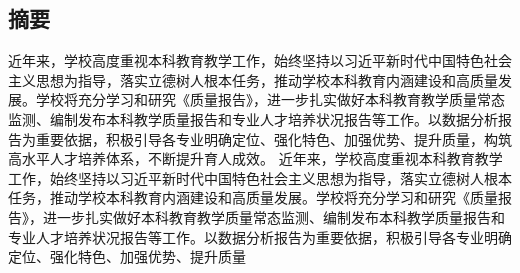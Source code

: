 \begin{ujnabstract}
\section[摘要]{摘\qquad 要}
%
%
%
近年来，学校高度重视本科教育教学工作，始终坚持以习近平新时代中国特色社会主义思想为指导，落实立德树人根本任务，推动学校本科教育内涵建设和高质量发展。学校将充分学习和研究《质量报告》，进一步扎实做好本科教育教学质量常态监测、编制发布本科教学质量报告和专业人才培养状况报告等工作。以数据分析报告为重要依据，积极引导各专业明确定位、强化特色、加强优势、提升质量，构筑高水平人才培养体系，不断提升育人成效。
近年来，学校高度重视本科教育教学工作，始终坚持以习近平新时代中国特色社会主义思想为指导，落实立德树人根本任务，推动学校本科教育内涵建设和高质量发展。学校将充分学习和研究《质量报告》，进一步扎实做好本科教育教学质量常态监测、编制发布本科教学质量报告和专业人才培养状况报告等工作。以数据分析报告为重要依据，积极引导各专业明确定位、强化特色、加强优势、提升质量
\small{}
\end{ujnabstract}
